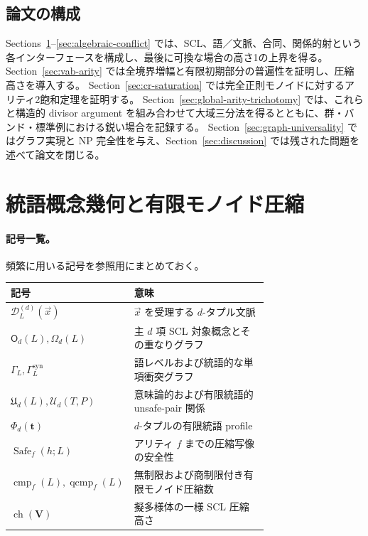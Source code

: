 \documentclass[10pt,a4paper]{ltjsarticle}
\theoremstyle{definition}
\theoremstyle{remark}
\newcommand{\cmp}{\operatorname{cmp}}
\newcommand{\qcmp}{\operatorname{qcmp}}
\newcommand{\D}{\mathcal D}
\newcommand{\Obj}{\mathsf O}
\newcommand{\Om}{\Omega}
\begin{document}
\subsection{論文の構成}

Sections~\ref{sec:scl-geometry}--\ref{sec:algebraic-conflict} では、SCL、語／文脈、合同、関係的射という各インターフェースを構成し、最後に可換な場合の高さ1の上界を得る。
Section~\ref{sec:vab-arity} では全境界増幅と有限初期部分の普遍性を証明し、圧縮高さを導入する。
Section~\ref{sec:cr-saturation} では完全正則モノイドに対するアリティ2飽和定理を証明する。
Section~\ref{sec:global-arity-trichotomy} では、これらと構造的 divisor argument を組み合わせて大域三分法を得るとともに、群・バンド・標準例における鋭い場合を記録する。
Section~\ref{sec:graph-universality} ではグラフ実現と NP 完全性を与え、Section~\ref{sec:discussion} では残された問題を述べて論文を閉じる。

\section{統語概念幾何と有限モノイド圧縮}
\label{sec:scl-geometry}

\paragraph{記号一覧。}
頻繁に用いる記号を参照用にまとめておく。
\begin{center}
\small
\begin{tabular}{@{}l p{0.72\linewidth}@{}}
\toprule
記号 & 意味\\
\midrule
\(\D_L^{(d)}(\vec x)\) & \(\vec x\) を受理する $d$-タプル文脈\\
\(\Obj_d(L),\Om_d(L)\) & 主 $d$ 項 SCL 対象概念とその重なりグラフ\\
\(\Gamma_L,\Gamma_L^{\mathrm{syn}}\) & 語レベルおよび統語的な単項衝突グラフ\\
\(\mathfrak U_d(L),\mathcal U_d(T,P)\) & 意味論的および有限統語的 unsafe-pair 関係\\
\(\Phi_d(\mathbf t)\) & $d$-タプルの有限統語 profile\\
\(\operatorname{Safe}_f(h;L)\) & アリティ $f$ までの圧縮写像の安全性\\
\(\cmp_f(L),\qcmp_f(L)\) & 無制限および商制限付き有限モノイド圧縮数\\
\(\operatorname{ch}(\mathbf V)\) & 擬多様体の一様 SCL 圧縮高さ\\
\bottomrule
\end{tabular}
\end{center}
\end{document}
